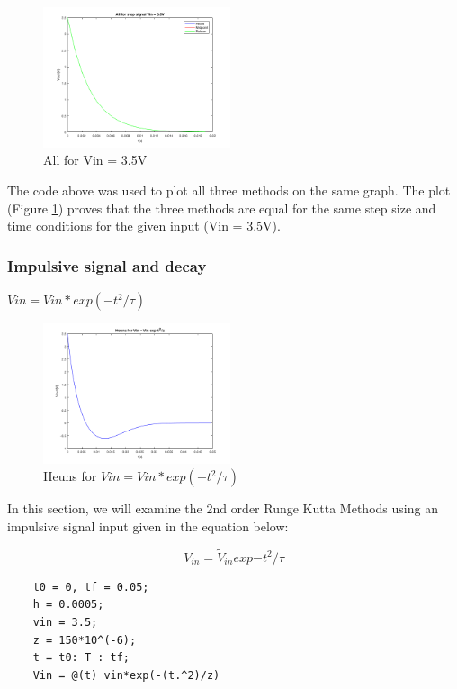 \documentclass[11pt,a4paper]{article}
\begin{document}
  \begin{figure}[h]
    \includegraphics[width=0.49\textwidth,center]{Ex1_Figs/all_step.png}
    \caption{All for Vin = 3.5V}
    \label{fig:RL5}
    \end{figure}
 The code above was used to plot all three methods on the same graph. The plot (Figure \ref{fig:RL5}) proves that the three methods are equal for the same step size and time conditions for the given input (Vin = 3.5V).


\newpage
\subsubsection{Impulsive signal and decay}
$Vin = Vin*exp(-t^2/\tau)$

\begin{figure}
\vspace{-15mm}
\includegraphics[width=0.49\textwidth,center]{Ex1_Figs/heun_t2.png}
\vspace{-6mm}
\caption{Heuns for $Vin = Vin*exp(-t^2/\tau)$}
\label{fig:RL6}
\end{figure}

In this section, we will examine the 2nd order Runge Kutta Methods using an impulsive signal input given in the equation below:

 \begin{equation}
V_{in} = \tilde{V}_{in}  exp{-t^2/\tau}
\end{equation}

 \begin{verbatim}
    t0 = 0, tf = 0.05;
    h = 0.0005;
    vin = 3.5;
    z = 150*10^(-6);
    t = t0: T : tf;
    Vin = @(t) vin*exp(-(t.^2)/z)
    \end{verbatim}
\end{document}
